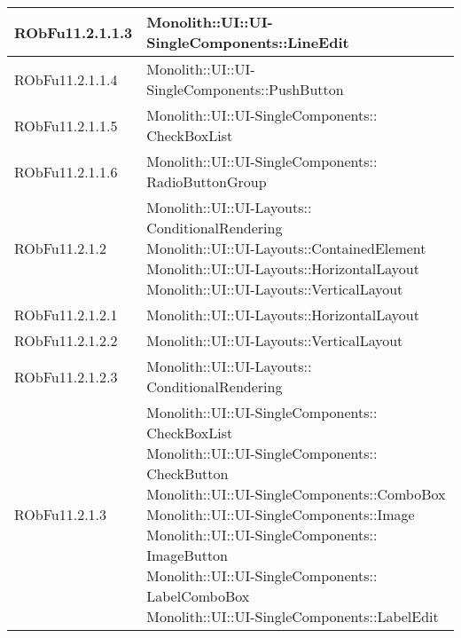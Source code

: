 \begin{center}
\begin{longtable}{|
*{1}{>{\centering\arraybackslash}m{2.5cm}|}
*{1}{>{\centering\arraybackslash}m{7.5cm}|}}
RObFu11.2.1.1.3 & \makecell[l]{Monolith::UI::UI-SingleComponents::LineEdit
\\}\\\hline
RObFu11.2.1.1.4 & \makecell[l]{Monolith::UI::UI-SingleComponents::PushButton
\\}\\\hline
RObFu11.2.1.1.5 & \makecell[l]{Monolith::UI::UI-SingleComponents:: \\ \hfill CheckBoxList
\\}\\\hline
RObFu11.2.1.1.6 & \makecell[l]{Monolith::UI::UI-SingleComponents:: \\ \hfill RadioButtonGroup
\\}\\\hline
RObFu11.2.1.2 & \makecell[l]{Monolith::UI::UI-Layouts:: \\ \hfill ConditionalRendering
\\Monolith::UI::UI-Layouts::ContainedElement
\\Monolith::UI::UI-Layouts::HorizontalLayout
\\Monolith::UI::UI-Layouts::VerticalLayout
\\}\\\hline
RObFu11.2.1.2.1 & \makecell[l]{Monolith::UI::UI-Layouts::HorizontalLayout
\\}\\\hline
RObFu11.2.1.2.2 & \makecell[l]{Monolith::UI::UI-Layouts::VerticalLayout
\\}\\\hline
RObFu11.2.1.2.3 & \makecell[l]{Monolith::UI::UI-Layouts:: \\ \hfill ConditionalRendering
\\}\\\hline
RObFu11.2.1.3 & \makecell[l]{Monolith::UI::UI-SingleComponents:: \\ \hfill CheckBoxList
\\Monolith::UI::UI-SingleComponents:: \\ \hfill CheckButton
\\Monolith::UI::UI-SingleComponents::ComboBox
\\Monolith::UI::UI-SingleComponents::Image
\\Monolith::UI::UI-SingleComponents:: \\ \hfill ImageButton
\\Monolith::UI::UI-SingleComponents:: \\ \hfill LabelComboBox
\\Monolith::UI::UI-SingleComponents::LabelEdit
}
\end{longtable}
\end{center}
